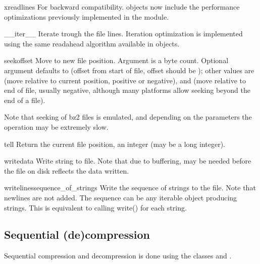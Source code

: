 \begin{methoddesc}[BZ2File]{xreadlines}{}
For backward compatibility.  objects now include the
performance optimizations previously implemented in the 
module.
\end{methoddesc}

\begin{methoddesc}[BZ2File]{\_\_iter\_\_}{}
Iterate trough the file lines. Iteration optimization is implemented
using the same readahead algorithm available in  objects.
\end{methoddesc}

\begin{methoddesc}[BZ2File]{seek}{offset}
Move to new file position. Argument  is a byte count. Optional
argument  defaults to  (offset from start of file,
offset should be ); other values are  (move relative to
current position, positive or negative), and  (move relative to end
of file, usually negative, although many platforms allow seeking beyond
the end of a file).

Note that seeking of bz2 files is emulated, and depending on the parameters
the operation may be extremely slow.
\end{methoddesc}

\begin{methoddesc}[BZ2File]{tell}{}
Return the current file position, an integer (may be a long integer).
\end{methoddesc}

\begin{methoddesc}[BZ2File]{write}{data}
Write string  to file. Note that due to buffering, 
may be needed before the file on disk reflects the data written.
\end{methoddesc}

\begin{methoddesc}[BZ2File]{writelines}{sequence_of_strings}
Write the sequence of strings to the file. Note that newlines are not added.
The sequence can be any iterable object producing strings. This is equivalent
to calling write() for each string.
\end{methoddesc}


\subsection{Sequential (de)compression}

Sequential compression and decompression is done using the classes
 and .

